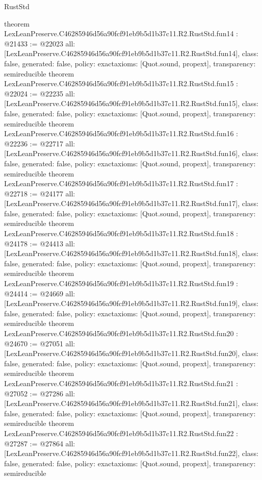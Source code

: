 \begin{lexlean}{RustStd}
\begin{coremodule}
{}
theorem LexLeanPreserve.C46285946d56a90fcf91eb9b5d1b37c11.R2.RustStd.fun14 : @21433 := @22023 {
  all: [LexLeanPreserve.C46285946d56a90fcf91eb9b5d1b37c11.R2.RustStd.fun14],
  class: false,
  generated: false,
  policy: exact{axioms: [Quot.sound, propext]},
  transparency: semireducible
}
theorem LexLeanPreserve.C46285946d56a90fcf91eb9b5d1b37c11.R2.RustStd.fun15 : @22024 := @22235 {
  all: [LexLeanPreserve.C46285946d56a90fcf91eb9b5d1b37c11.R2.RustStd.fun15],
  class: false,
  generated: false,
  policy: exact{axioms: [Quot.sound, propext]},
  transparency: semireducible
}
theorem LexLeanPreserve.C46285946d56a90fcf91eb9b5d1b37c11.R2.RustStd.fun16 : @22236 := @22717 {
  all: [LexLeanPreserve.C46285946d56a90fcf91eb9b5d1b37c11.R2.RustStd.fun16],
  class: false,
  generated: false,
  policy: exact{axioms: [Quot.sound, propext]},
  transparency: semireducible
}
theorem LexLeanPreserve.C46285946d56a90fcf91eb9b5d1b37c11.R2.RustStd.fun17 : @22718 := @24177 {
  all: [LexLeanPreserve.C46285946d56a90fcf91eb9b5d1b37c11.R2.RustStd.fun17],
  class: false,
  generated: false,
  policy: exact{axioms: [Quot.sound, propext]},
  transparency: semireducible
}
theorem LexLeanPreserve.C46285946d56a90fcf91eb9b5d1b37c11.R2.RustStd.fun18 : @24178 := @24413 {
  all: [LexLeanPreserve.C46285946d56a90fcf91eb9b5d1b37c11.R2.RustStd.fun18],
  class: false,
  generated: false,
  policy: exact{axioms: [Quot.sound, propext]},
  transparency: semireducible
}
theorem LexLeanPreserve.C46285946d56a90fcf91eb9b5d1b37c11.R2.RustStd.fun19 : @24414 := @24669 {
  all: [LexLeanPreserve.C46285946d56a90fcf91eb9b5d1b37c11.R2.RustStd.fun19],
  class: false,
  generated: false,
  policy: exact{axioms: [Quot.sound, propext]},
  transparency: semireducible
}
theorem LexLeanPreserve.C46285946d56a90fcf91eb9b5d1b37c11.R2.RustStd.fun20 : @24670 := @27051 {
  all: [LexLeanPreserve.C46285946d56a90fcf91eb9b5d1b37c11.R2.RustStd.fun20],
  class: false,
  generated: false,
  policy: exact{axioms: [Quot.sound, propext]},
  transparency: semireducible
}
theorem LexLeanPreserve.C46285946d56a90fcf91eb9b5d1b37c11.R2.RustStd.fun21 : @27052 := @27286 {
  all: [LexLeanPreserve.C46285946d56a90fcf91eb9b5d1b37c11.R2.RustStd.fun21],
  class: false,
  generated: false,
  policy: exact{axioms: [Quot.sound, propext]},
  transparency: semireducible
}
theorem LexLeanPreserve.C46285946d56a90fcf91eb9b5d1b37c11.R2.RustStd.fun22 : @27287 := @27864 {
  all: [LexLeanPreserve.C46285946d56a90fcf91eb9b5d1b37c11.R2.RustStd.fun22],
  class: false,
  generated: false,
  policy: exact{axioms: [Quot.sound, propext]},
  transparency: semireducible
}
\end{coremodule}
\end{lexlean}
